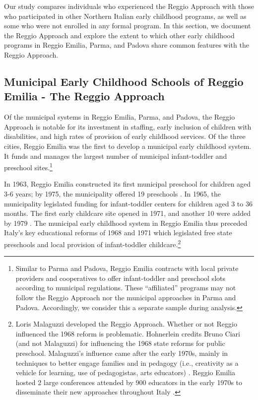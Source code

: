 Our study compares individuals who experienced the Reggio Approach with those who participated in other Northern Italian early childhood programs, as well as some who were not enrolled in any formal program. In this section, we document the Reggio Approach and explore the extent to which other early childhood programs in Reggio Emilia, Parma, and Padova share common features with the Reggio Approach.

\subsection{Municipal Early Childhood Schools of Reggio Emilia - The Reggio Approach}

Of the municipal systems in Reggio Emilia, Parma, and Padova, the Reggio Approach is notable for its investment in staffing, early inclusion of children with disabilities, and high rates of provision of early childhood services. Of the three cities, Reggio Emilia was the first to develop a municipal early childhood system. It funds and manages the largest number of municipal infant-toddler and preschool sites.\footnote{Similar to Parma and Padova, Reggio Emilia contracts with local private providers and cooperatives to offer infant-toddler and preschool slots according to municipal regulations. These ``affiliated'' programs may not follow the Reggio Approach nor the municipal approaches in Parma and Padova. Accordingly, we consider this a separate sample during analysis.} 

In 1963, Reggio Emilia constructed its first municipal preschool for children aged 3-6 years; by 1975, the municipality offered 19 preschools \citep{Hohnerlein_2009_Paradox-Public-Preschools}. In 1965, the municipality legislated funding for infant-toddler centers for children aged 3 to 36 months. The first early childcare site opened in 1971, and another 10 were added by 1979 \citep{Cagliari-etal-eds_2016_BOOK_Loris-Malaguzzi}. The municipal early childhood system in Reggio Emilia thus preceded Italy's key educational reforms of 1968 and 1971 which legislated free state preschools and local provision of infant-toddler childcare.\footnote{Loris Malaguzzi developed the Reggio Approach. Whether or not Reggio influenced the 1968 reform is problematic. Hohnerlein \citeyearpar{Hohnerlein_2009_Paradox-Public-Preschools} credits Bruno Ciari (and not Malaguzzi) for influencing the 1968 state reforms for public preschool. Malaguzzi's influence came after the early 1970s, mainly in techniques to better engage families and in pedagogy (i.e., creativity as a vehicle for learning, use of pedagogistas, arts educators) \citep{OECD_2001_Italy-Country-Note}. Reggio Emilia hosted 2 large conferences attended by 900 educators in the early 1970s to disseminate their new approaches throughout Italy \citep{Cagliari-etal-eds_2016_BOOK_Loris-Malaguzzi}.}

